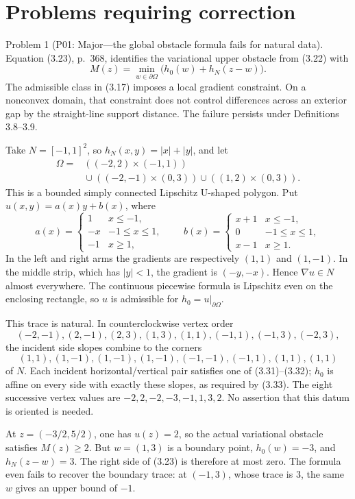 \documentclass[10pt]{article}
\begin{document}
\section*{Problems requiring correction}
Problem 1 (P01: Major—the global obstacle formula fails for natural data).  Equation (3.23), p. 368, identifies the variational upper obstacle from (3.22) with \[M(z)=\min_{w\in\partial\Omega}\bigl(h_0(w)+h_N(z-w)\bigr).\] The admissible class in (3.17) imposes a local gradient constraint. On a nonconvex domain, that constraint does not control differences across an exterior gap by the straight-line support distance. The failure persists under Definitions 3.8–3.9.\par
Take \(N=[-1,1]^2\), so \(h_N(x,y)=|x|+|y|\), and let \[\begin{split}
 \Omega={}&((-2,2)\times(-1,1))\\
 &{}\cup((-2,-1)\times(0,3))
       \cup((1,2)\times(0,3)).
\end{split}\] This is a bounded simply connected Lipschitz U-shaped polygon. Put \(u(x,y)=a(x)y+b(x)\), where \[a(x)=
 \begin{cases}1&x\leq-1,\\-x&-1\leq x\leq1,\\-1&x\geq1,\end{cases}
 \qquad
 b(x)=
 \begin{cases}x+1&x\leq-1,\\0&-1\leq x\leq1,\\x-1&x\geq1.\end{cases}\] In the left and right arms the gradients are respectively \((1,1)\) and \((1,-1)\). In the middle strip, which has \(|y|<1\), the gradient is \((-y,-x)\). Hence \(\nabla u\in N\) almost everywhere. The continuous piecewise formula is Lipschitz even on the enclosing rectangle, so \(u\) is admissible for \(h_0=u|_{\partial\Omega}\).\par
This trace is natural. In counterclockwise vertex order \[(-2,-1),(2,-1),(2,3),(1,3),(1,1),(-1,1),(-1,3),(-2,3),\] the incident side slopes combine to the corners \[(1,1),(1,-1),(1,-1),(1,-1),
 (-1,-1),(-1,1),(1,1),(1,1)\] of \(N\). Each incident horizontal/vertical pair satisfies one of (3.31)–(3.32); \(h_0\) is affine on every side with exactly these slopes, as required by (3.33). The eight successive vertex values are \(-2,2,-2,-3,-1,1,3,2\). No assertion that this datum is oriented is needed.\par
At \(z=(-3/2,5/2)\), one has \(u(z)=2\), so the actual variational obstacle satisfies \(M(z)\geq2\). But \(w=(1,3)\) is a boundary point, \(h_0(w)=-3\), and \(h_N(z-w)=3\). The right side of (3.23) is therefore at most zero. The formula even fails to recover the boundary trace: at \((-1,3)\), whose trace is \(3\), the same \(w\) gives an upper bound of \(-1\).\par
\end{document}
